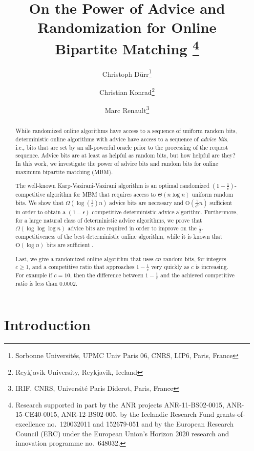 \documentclass[a4paper]{article}
\title{On the Power of Advice and Randomization for Online Bipartite Matching \footnote{Research supported in part by the ANR projects ANR-11-BS02-0015,  ANR-15-CE40-0015, ANR-12-BS02-005, by the Icelandic Research Fund grants-of-excellence no.\ 120032011 and 152679-051 and by the European Research Council (ERC) under the European Union’s Horizon 2020 research and innovation programme no.\ 648032.}}
\author{Christoph D\"{u}rr\thanks{Sorbonne Universités, UPMC Univ Paris 06, CNRS, LIP6, Paris, France}
\and
Christian Konrad\thanks{Reykjavik University, Reykjavik, Iceland}
\and
Marc Renault\thanks{IRIF, CNRS,  Universit\'{e} Paris Diderot, Paris, France}}
\newcommand{\Order}{\mathrm{O}}
\begin{document}
\maketitle

\begin{abstract}
While randomized online algorithms have access to a sequence of uniform random bits, deterministic
online algorithms with advice have access to a sequence of {\em advice bits}, i.e., bits that are set
by an all-powerful oracle prior to the processing of the request sequence.
Advice bits are at least as helpful as random bits, but how helpful are they? In this work, we investigate the
power of advice bits and random bits for online maximum bipartite matching (\textsc{MBM}).

The well-known Karp-Vazirani-Vazirani algorithm \cite{kvv90} is an optimal
randomized $(1-\frac{1}{e})$-competitive algorithm for \textsc{MBM} that requires access to
$\Theta(n \log n)$ uniform random bits. We show that $\Omega(\log(\frac{1}{\epsilon}) n)$ advice
bits are necessary and $\Order(\frac{1}{\epsilon^5} n)$ sufficient in order to obtain a
$(1-\epsilon)$-competitive deterministic advice algorithm. Furthermore,
for a large natural class of deterministic advice algorithms, we prove that
$\Omega(\log \log \log n)$ advice bits are required in order to improve on the $\frac{1}{2}$-competitiveness of
the best deterministic online algorithm, while it is known that $\Order(\log n)$
bits are sufficient \cite{bkkk11}.

Last, we give a randomized online algorithm that uses $c n$ random bits, for integers $c \ge 1$,
and a competitive ratio that approaches $1-\frac{1}{e}$ very quickly as $c$ is increasing.
For example if $c = 10$, then the difference between $1-\frac{1}{e}$ and the achieved competitive ratio
is less than $0.0002$.
\end{abstract}

\section{Introduction}
\end{document}
